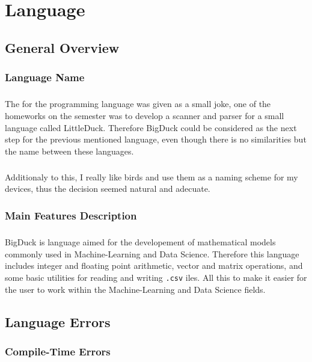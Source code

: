 
\chapter{Language}

\section{General Overview}
\subsection{Language Name}
\paragraph{} The for the programming language was given as a small joke, one of
the homeworks on the semester was to develop a scanner and parser for a small
language called LittleDuck. Therefore BigDuck could be considered as the next
step for the previous mentioned language, even though there is no similarities
but the name between these languages.

\paragraph{} Additionaly to this, I really like birds and use them as a naming
scheme for my devices, thus the decision seemed natural and adecuate.

\subsection{Main Features Description}
\paragraph{} BigDuck is language aimed for the developement of mathematical
models commonly used in Machine-Learning and Data Science. Therefore this
language includes integer and floating point arithmetic, vector and matrix
operations, and some basic utilities for reading and writing \texttt{.csv} 
iles. All this to make it easier for the user to work within the
Machine-Learning and Data Science fields.

\newpage

\section{Language Errors}
\subsection{Compile-Time Errors}
